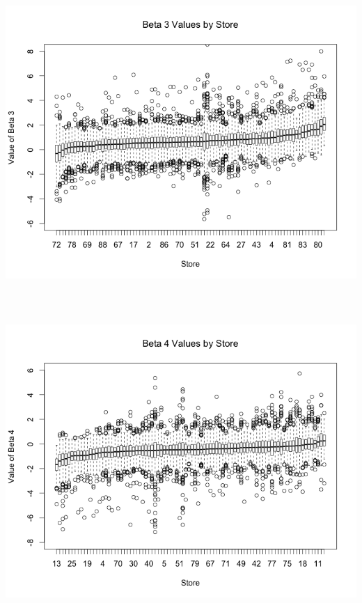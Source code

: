 \documentclass[12pt,letterpaper]{article}\usepackage[]{graphicx}\usepackage[]{color}
\begin{document}
\includegraphics[height=12cm, keepaspectratio]{new-beta3.png}\\
\includegraphics[height=12cm, keepaspectratio]{new-beta4.png}\\
\end{document}
